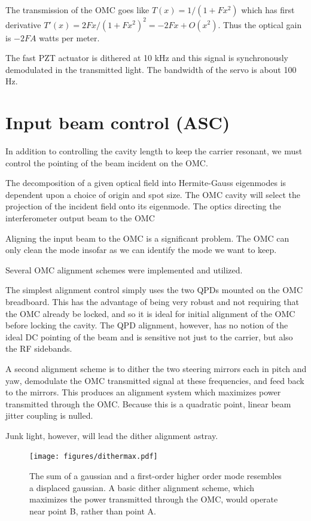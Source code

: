 The transmission of the OMC goes like $T(x) = 1/\left(1 + Fx^2\right)$
which has first derivative $T'(x) = 2 F x / \left(1 + F x^2\right)^2 =
- 2 F x + O(x^2)$.  Thus the optical gain is $-2 F A$ watts per meter.

The fast PZT actuator is dithered at 10 kHz and this signal is
synchronously demodulated in the transmitted light.  The bandwidth of
the servo is about 100 Hz.

\section{Input beam control (ASC)}

In addition to controlling the cavity length to keep the carrier
resonant, we must control the pointing of the beam incident on the
OMC.

The decomposition of a given optical field into Hermite-Gauss
eigenmodes is dependent upon a choice of origin and spot size.  The
OMC cavity will select the projection of the incident field onto its
eigenmode.  The optics directing the interferometer output beam to the
OMC

Aligning the input beam to the OMC is a significant problem.  The OMC
can only clean the mode insofar as we can identify the mode we want to
keep.

Several OMC alignment schemes were implemented and utilized.

The simplest alignment control simply uses the two QPDs mounted on the
OMC breadboard.  This has the advantage of being very robust and not
requiring that the OMC already be locked, and so it is ideal for
initial alignment of the OMC before locking the cavity.  The QPD
alignment, however, has no notion of the ideal DC pointing of the beam
and is sensitive not just to the carrier, but also the RF sidebands.

A second alignment scheme is to dither the two steering mirrors each
in pitch and yaw, demodulate the OMC transmitted signal at these
frequencies, and feed back to the mirrors.  This produces an alignment
system which maximizes power transmitted through the OMC.  Because
this is a quadratic point, linear beam jitter coupling is nulled.

Junk light, however, will lead the dither alignment astray.

\begin{figure}
\texttt{[image: figures/dithermax.pdf]}
\caption[Modal decomposition of a displaced Gaussian]{The sum of a gaussian and a first-order higher order mode
  resembles a displaced gaussian.  A basic dither alignment scheme,
  which maximizes the power transmitted through the OMC, would
  operate near point B, rather than point A.}
\end{figure}

